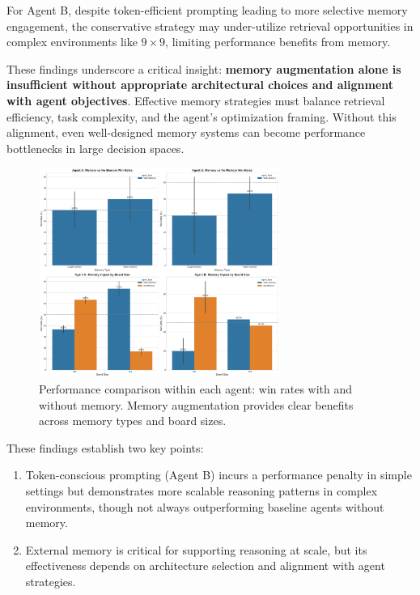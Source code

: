 \documentclass[10pt]{article}
\begin{document}
For Agent B, despite token-efficient prompting leading to more selective memory engagement, the conservative strategy may under-utilize retrieval opportunities in complex environments like $9\times9$, limiting performance benefits from memory.

These findings underscore a critical insight: \textbf{memory augmentation alone is insufficient without appropriate architectural choices and alignment with agent objectives}. Effective memory strategies must balance retrieval efficiency, task complexity, and the agent's optimization framing. Without this alignment, even well-designed memory systems can become performance bottlenecks in large decision spaces.

\begin{figure}[H]
\centering
\includegraphics[width=0.7\textwidth]{figures/memory_baseline/memory_baseline_comparison.png}
\caption{Performance comparison within each agent: win rates with and without memory. Memory augmentation provides clear benefits across memory types and board sizes.}
\label{fig:memory_baseline_comparison}
\end{figure}

These findings establish two key points: 
\begin{enumerate}[leftmargin=*,nosep]
    \item Token-conscious prompting (Agent B) incurs a performance penalty in simple settings but demonstrates more scalable reasoning patterns in complex environments, though not always outperforming baseline agents without memory.
    \item External memory is critical for supporting reasoning at scale, but its effectiveness depends on architecture selection and alignment with agent strategies.
\end{enumerate}
\end{document}
